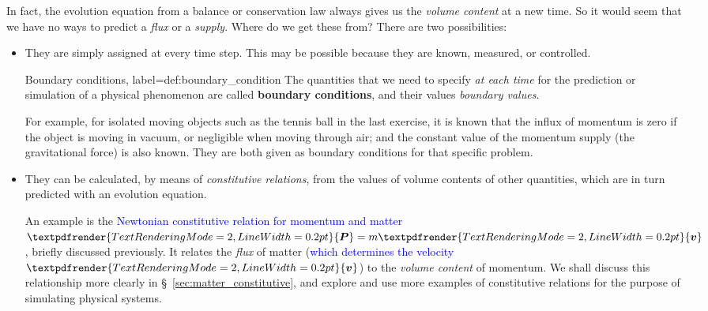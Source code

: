 \documentclass[a4paper,12pt,%
onecolumn,oneside,%
british%
]{memoir}
\renewcommand*{\bm}[1]{\textpdfrender{TextRenderingMode=2,LineWidth=0.2pt}{\boldsymbol{#1}}}
\renewcommand*{\|}[1][]{\nonscript\:#1\vert\nonscript\:\mathopen{}}
\newcommand*{\sect}{\S}%
\renewcommand*{\autoref}[2]{\sidepar{\vspace{-1ex}\footnotesize{\color{blue}\faIcon{%
angle-right%
}\enspace\sect~\ref{#1} page~\pageref{#1}}}\textcolor{blue}{#2}}
\newcommand*{\yv}{\bm{v}}
\newcommand*{\yM}{m}%
\newcommand*{\yP}{\bm{P}}
\begin{document}
In fact, the evolution equation from a balance or conservation law always gives us the \emph{volume content} at a new time. So it would seem that we have no ways to predict a \emph{flux} or a \emph{supply}. Where do we get these from? There are two possibilities:
\begin{itemize}[para]
\item They are simply assigned at every time step. This may be possible because they are known, measured, or controlled.
  \begin{definition}{Boundary conditions, label={def:boundary_condition}}
    The quantities that we need to specify \emph{at each time} for the prediction or simulation of a physical phenomenon are called \textbf{boundary conditions}, and their values \emph{boundary values}.
  \end{definition}

  For example, for isolated moving objects such as the tennis ball in the last exercise, it is known that the influx of momentum is zero if the object is moving in vacuum, or negligible when moving through air; and the constant value of the momentum supply (the gravitational force) is also known. They are both given as boundary conditions for that specific problem.

\item They can be calculated, by means of \emph{constitutive relations}, from the values of volume contents of other quantities, which are in turn predicted with an evolution equation.

  An example is the \autoref{item:momentum_mass_velocity}{Newtonian constitutive relation for momentum and matter} $\yP = \yM\yv$, briefly discussed previously. It relates the \emph{flux} of matter (\autoref{sec:fluxes_velocities}{which determines the velocity $\yv$}) to the \emph{volume content} of momentum. We shall discuss this relationship more clearly in \sect~\ref{sec:matter_constitutive}, and explore and use more examples of constitutive relations for the purpose of simulating physical systems.
\end{itemize}
\end{document}
